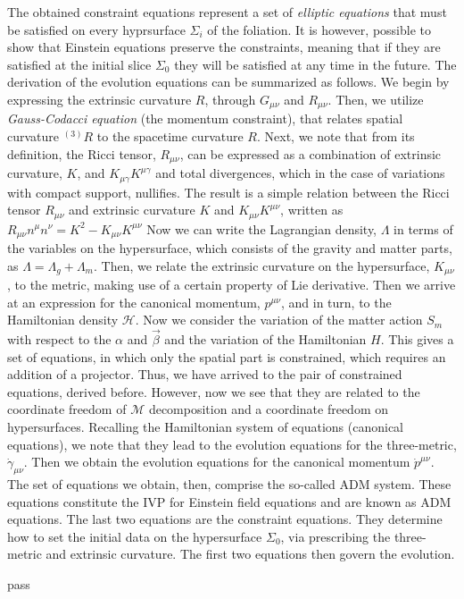 {    %
    The obtained constraint equations represent a set of \textit{elliptic equations} that must be satisfied on every hyprsurface $\Sigma_i$ of the foliation. 
    It is however, possible to show that Einstein equations preserve the constraints, meaning that if they are satisfied at the initial slice $\Sigma_0$ they will be satisfied at any time in the future. 
    The derivation of the evolution equations can be summarized as follows. 
    We begin by expressing the extrinsic curvature $R$, through $G_{\mu\nu}$ and $R_{\mu\nu}$. 
    Then, we utilize \textit{Gauss-Codacci equation} (the momentum constraint), that relates spatial curvature $^{(3)}R$ to the spacetime curvature $R$.
    Next, we note that from its definition, the Ricci tensor, $R_{\mu\nu}$, can be expressed as a combination of extrinsic curvature, $K$, and $K_{\mu\gamma}K^{\mu\gamma}$ and total divergences, which in the case of variations with compact support, nullifies. 
    The result is a simple relation between the Ricci tensor $R_{\mu\nu}$ and extrinsic curvature $K$ and $K_{\mu\nu}K^{\mu\nu}$, written as 
    $R_{\mu\nu}n^{\mu}n^{\nu}= K^2 - K_{\mu\nu}K^{\mu\nu}$
    Now we can write the Lagrangian density, $\Lambda$ in terms of the variables on the hypersurface, which consists of the gravity and matter parts, as $\Lambda = \Lambda_g+\Lambda_m$. 
    Then, we relate the extrinsic curvature on the hypersurface, $K_{\mu\nu}$, to the metric, making use of a certain property of Lie derivative. 
    Then we arrive at an expression for the canonical momentum, $p^{\mu\nu}$, and in turn, to the Hamiltonian density $\mathcal{H}$.
    Now we consider the variation of the matter action $S_m$ with respect to the $\alpha$ and $\vec{\beta}$ and the variation of the Hamiltonian $H$.
    This gives a set of equations, in which only the spatial part is constrained, which requires an addition of a projector. Thus, we have arrived to the pair of constrained equations, derived before. However, now we see that they are related to the coordinate freedom of $\mathcal{M}$ decomposition and a coordinate freedom on hypersurfaces.
    Recalling the Hamiltonian system of equations (canonical equations), we note that they lead to the evolution equations for the three-metric, $\dot{\gamma}_{\mu\nu}$. Then we obtain the evolution equations for the canonical momentum $\dot{p}^{\mu\nu}$. The set of equations we obtain, then, comprise the so-called ADM system.
    These equations constitute the IVP for Einstein field equations and are known as ADM equations. The last two equations are the constraint equations. They determine how to set the initial data on the hypersurface $\Sigma_0$, via prescribing the three-metric and extrinsic curvature. The first two equations then govern the evolution.
    

}{
    pass
}

